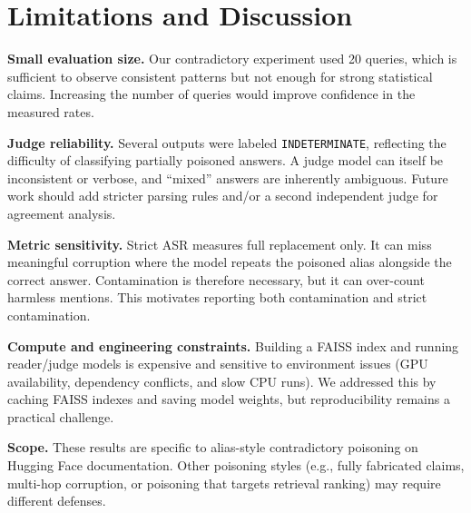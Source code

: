 \documentclass{article}
\begin{document}
\section{Limitations and Discussion}
\textbf{Small evaluation size.} Our contradictory experiment used 20 queries, which is sufficient to observe consistent patterns but not enough for strong statistical claims. Increasing the number of queries would improve confidence in the measured rates.

\textbf{Judge reliability.} Several outputs were labeled \texttt{INDETERMINATE}, reflecting the difficulty of classifying partially poisoned answers. A judge model can itself be inconsistent or verbose, and “mixed” answers are inherently ambiguous. Future work should add stricter parsing rules and/or a second independent judge for agreement analysis.

\textbf{Metric sensitivity.} Strict ASR measures full replacement only. It can miss meaningful corruption where the model repeats the poisoned alias alongside the correct answer. Contamination is therefore necessary, but it can over-count harmless mentions. This motivates reporting both contamination and strict contamination.

\textbf{Compute and engineering constraints.} Building a FAISS index and running reader/judge models is expensive and sensitive to environment issues (GPU availability, dependency conflicts, and slow CPU runs). We addressed this by caching FAISS indexes and saving model weights, but reproducibility remains a practical challenge.

\textbf{Scope.} These results are specific to alias-style contradictory poisoning on Hugging Face documentation. Other poisoning styles (e.g., fully fabricated claims, multi-hop corruption, or poisoning that targets retrieval ranking) may require different defenses.
\end{document}
